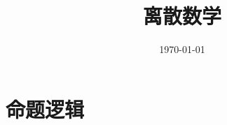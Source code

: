 \documentclass{article}
\title{离散数学}
\author{}
\date{\today}
\begin{document}
\hypersetup{
    hidelinks,
    allcolors = black,
    breaklinks = true
}

\newtheorem{definition}{Definition}[subsection]
\newtheorem{theorem}{Theorem}[subsection]
\newtheorem{corollary}{Corollary}[theorem]
\renewcommand{\proofname}{\indent\bf Proof}

\def\e{\mathrm e}
\def\i{\mathrm i}
\def\j{\mathrm j}
\def\d{\mathrm d}
\def\C{\mathrm C}
\def\div{\mathrm{div}}
\def\rot{\mathrm{rot}}
\def\vecv{\vec{\mathrm v}}
\def\sr{\mathbb R}
\def\sn{\mathbb N}
\def\snp{\mathbb N^+}
\def\sc{\mathbb C}
\def\sz{\mathbb Z}
\def\impint{\int\limits_{-\infty}^{+\infty}}

\newcommand{\abs}[1]{\left|#1\right|}
\newcommand{\pare}[1]{\left(#1\right)}
\newcommand{\pair}[2]{\left<#1,#2\right>}
\newcommand{\jacobi}[2]{\frac{\partial\pare{#1}}{\partial\pare{#2}}}
\newcommand{\conditionset}[2]{\left\{#1|#2\right\}}

\begin{titlepage}
    \maketitle
\end{titlepage}

\tableofcontents
\newpage

\part{命题逻辑}
\end{document}
